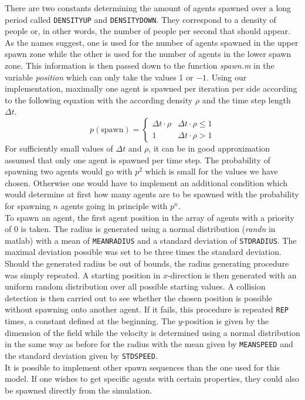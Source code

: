 \noi There are two constants determining the amount of agents spawned over a long period called \texttt{DENSITYUP} and \texttt{DENSITYDOWN}. They correspond to a density of people or, in other words, the number of people per second that should appear. As the names suggest, one is used for the number of agents spawned in the upper spawn zone while the other is used for the number of agents in the lower spawn zone. This information is then passed down to the function \textit{spawn.m} in the variable \textit{position} which can only take the values 1 or $-1$. Using our implementation, maximally one agent is spawned per iteration per side according to the following equation with the according density $\rho$ and the time step length $\Delta t$.
\begin{equation}\label{iteration1}
	p(\text{spawn}) = \left\{\begin{array}{cc}\Delta t \cdot \rho&\Delta t \cdot \rho \leq 1\\1&\Delta t \cdot \rho > 1\end{array}\right.
\end{equation}
\noi For sufficiently small values of $\Delta t$ and $\rho$, it can be in good approximation assumed that only one agent is spawned per time step. The probability of spawning two agents would go with $p^2$ which is small for the values we have chosen. Otherwise one would have to implement an additional condition which would determine at first how many agents are to be spawned with the probability for spawning $n$ agents going in principle with $p^n$.\\

\noi To spawn an agent, the first agent position in the array of agents with a priority of 0 is taken. The radius is generated using a normal distribution (\textit{randn} in matlab) with a mean of \texttt{MEANRADIUS} and a standard deviation of \texttt{STDRADIUS}. The maximal deviation possible was set to be three times the standard deviation. Should the generated radius be out of bounds, the radius generating procedure was simply repeated. A starting position in $x$-direction is then generated with an uniform random distribution over all possible starting values. A collision detection is then carried out to see whether the chosen position is possible without spawning onto another agent. If it fails, this procedure is repeated \texttt{REP} times, a constant defined at the beginning. The $y$-position is given by the dimension of the field while the velocity is determined using a normal distribution in the same way as before for the radius with the mean given by \texttt{MEANSPEED} and the standard deviation given by \texttt{STDSPEED}.\\

\noi It is possible to implement other spawn sequences than the one used for this model. If one wishes to get specific agents with certain properties, they could also be spawned directly from the simulation.
